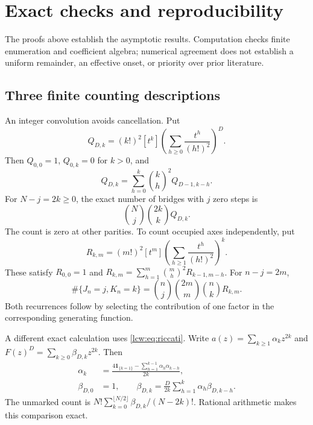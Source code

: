 \documentclass[11pt,letterpaper]{article}
\theoremstyle{remark}\newtheorem{remark}[theorem]{Remark}
\newcommand{\one}{\mathbf 1}\newcommand{\DD}{\mathcal D}
\begin{document}
\section{Exact checks and reproducibility}\label{lcw:sec:verification}
The proofs above establish the asymptotic results. Computation checks finite enumeration and coefficient algebra; numerical agreement does not establish a uniform remainder, an effective onset, or priority over prior literature.

\subsection{Three finite counting descriptions}
An integer convolution avoids cancellation. Put
\begin{equation}\label{lcw:eq:Qcount}
 Q_{D,k}=(k!)^2[t^k]\left(\sum_{h\ge0}\frac{t^h}{(h!)^2}\right)^D.
\end{equation}
Then $Q_{0,0}=1$, $Q_{0,k}=0$ for $k>0$, and
\begin{equation}\label{lcw:eq:Qconvolution}
 Q_{D,k}=\sum_{h=0}^k\binom kh^2 Q_{D-1,k-h}.
\end{equation}
For $N-j=2k\ge0$, the exact number of bridges with $j$ zero steps is
\begin{equation}\label{lcw:eq:exactJ}
 \binom Nj\binom{2k}k Q_{D,k}.
\end{equation}
The count is zero at other parities. To count occupied axes independently, put
\[
 R_{k,m}=(m!)^2[t^m]\left(\sum_{h\ge1}\frac{t^h}{(h!)^2}\right)^k.
\]
These satisfy $R_{0,0}=1$ and
$R_{k,m}=\sum_{h=1}^m\binom mh^2R_{k-1,m-h}$. For $n-j=2m$,
\begin{equation}\label{lcw:eq:exactJK}
 \#\{J_n=j,K_n=k\}=\binom nj\binom{2m}m\binom nk R_{k,m}.
\end{equation}
Both recurrences follow by selecting the contribution of one factor in the corresponding generating function.

A different exact calculation uses \eqref{lcw:eq:riccati}. Write
$a(z)=\sum_{k\ge1}\alpha_kz^{2k}$ and $F(z)^D=\sum_{k\ge0}\beta_{D,k}z^{2k}$. Then
\begin{align}
 \alpha_k&=\frac{4\one_{\{k=1\}}-\sum_{h=1}^{k-1}\alpha_h\alpha_{k-h}}{2k},\label{lcw:eq:alpha}\\
 \beta_{D,0}&=1,\qquad
 \beta_{D,k}=\frac{D}{2k}\sum_{h=1}^k\alpha_h\beta_{D,k-h}.\label{lcw:eq:beta}
\end{align}
The unmarked count is $N!\sum_{k=0}^{\lfloor N/2\rfloor}\beta_{D,k}/(N-2k)!$. Rational arithmetic makes this comparison exact.
\end{document}
